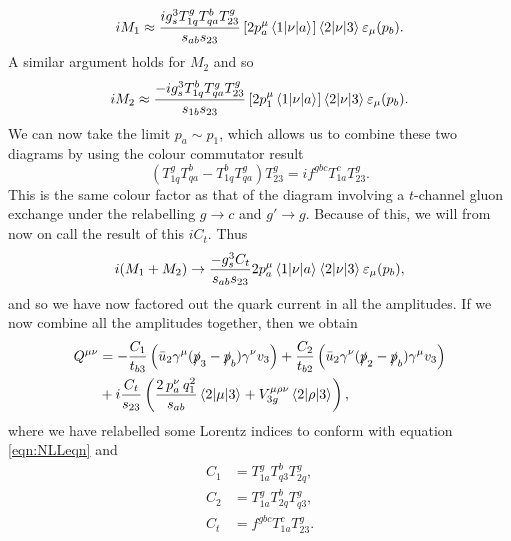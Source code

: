 \begin{equation}
iM_1 \approx \frac{i g_s^3 T^g_{1q}T^b_{qa}T^g_{23}}{s_{ab}s_{23}} \left[ 2p_a^\mu \mathinner{\langle1\vert\nu\vert a\rangle}_{} \right] \mathinner{\langle2\vert\nu\vert3\rangle}_{} \varepsilon_\mu (p_b).
\end{equation}
A similar argument holds for $M_2$ and so
\begin{equation}
iM_2 \approx \frac{-i g_s^3 T^b_{1q}T^g_{qa}T^g_{23}}{s_{1b}s_{23}} \left[ 2p_1^\mu \mathinner{\langle1\vert\nu\vert a\rangle}_{} \right] \mathinner{\langle2\vert\nu\vert3\rangle}_{} \varepsilon_\mu (p_b).
\end{equation}
We can now take the limit $p_a \sim p_1$, which allows us to combine these two diagrams by using the colour commutator result
\begin{equation}
(T^g_{1q}T^b_{qa}- T^b_{1q}T^g_{qa})T^g_{23} = i f^{gbc}T^c_{1a}T^g_{23}.
\end{equation}
This is the same colour factor as that of the diagram involving a $t$-channel gluon exchange under the relabelling $g \to c$ and $g' \to g$. Because of this, we will from now on call the result of this $i C_t$. Thus
\begin{equation}
i(M_1 + M_2) \to \frac{- g_s^3 C_t}{s_{ab}s_{23}}2p_a^\mu \mathinner{\langle1\vert\nu\vert a\rangle}_{} \mathinner{\langle2\vert\nu\vert3\rangle}_{} \varepsilon_\mu (p_b),
\end{equation}
and so we have now factored out the quark current in all the amplitudes. If we now combine all the amplitudes together, then we obtain
\begin{equation}
\begin{split}
Q^{\mu \nu} &= -\frac{C_1}{t_{b3}} \left(\bar{u}_2 \gamma^\mu (\slashed{p}_3-\slashed{p}_b)\gamma^\nu v_3 \right) + \frac{C_2}{t_{b2}} \left( \bar{u}_2 \gamma^\nu (\slashed{p}_2-\slashed{p}_b) \gamma^\mu v_3 \right) \\
&+ i  \frac{C_t}{s_{23}} \left(\frac{2 \hspace{2pt} p_a^\nu \hspace{2pt} q_1^2}{s_{ab}}  \mathinner{\langle2\vert\mu\vert3\rangle}_{} + V^{\mu \rho \nu}_{3g}  \mathinner{\langle2\vert\rho\vert3\rangle}_{} \right),
\end{split}
\end{equation}
where we have relabelled some Lorentz indices to conform with equation \ref{eqn:NLLeqn} and
\begin{subequations}
\begin{align}
C_1 &= T^g_{1a} T^b_{q3}T^g_{2q}, \\
C_2 &= T^g_{1a} T^b_{2q}T^g_{q3}, \\
C_t &= f^{gbc}T^c_{1a}T^g_{23}.
\end{align}
\end{subequations}
